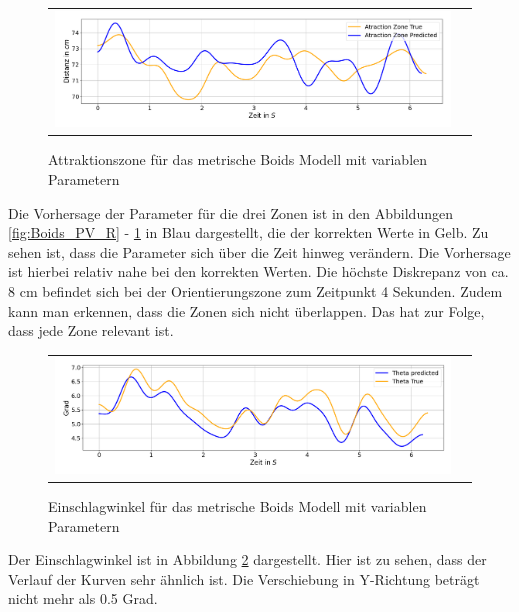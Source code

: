 \begin{figure}[H]
\centering
\begin{tabular}{cc}
\includegraphics[width=1.0\textwidth]{figures/Experimente/Parameter_variabel/Boids_A.png} 
\end{tabular}
\caption{Attraktionszone für das metrische Boids Modell mit variablen Parametern \label{fig:Boids_PV_A}}
\end{figure}

Die Vorhersage der Parameter für die drei Zonen ist in den Abbildungen \ref{fig:Boids_PV_R} - \ref{fig:Boids_PV_A} in Blau dargestellt, die der korrekten Werte in Gelb. Zu sehen ist, dass die Parameter sich über die Zeit hinweg verändern.
Die Vorhersage ist hierbei relativ nahe bei den korrekten Werten. Die höchste Diskrepanz von ca. 8 cm befindet sich bei der Orientierungszone zum Zeitpunkt 4 Sekunden. Zudem kann man erkennen, dass die Zonen sich nicht überlappen. Das hat zur Folge, dass jede Zone relevant ist.

\begin{figure}[H]
\centering
\begin{tabular}{cc}
\includegraphics[width=1.0\textwidth]{figures/Experimente/Parameter_variabel/Boids_T.png} 
\end{tabular}
\caption{Einschlagwinkel für das metrische Boids Modell mit variablen Parametern \label{fig:Boids_PV_T}}
\end{figure}

Der Einschlagwinkel ist in Abbildung \ref{fig:Boids_PV_T} dargestellt. Hier ist zu sehen, dass der Verlauf der Kurven sehr ähnlich ist. Die Verschiebung in Y-Richtung beträgt nicht mehr als 0.5 Grad. 

